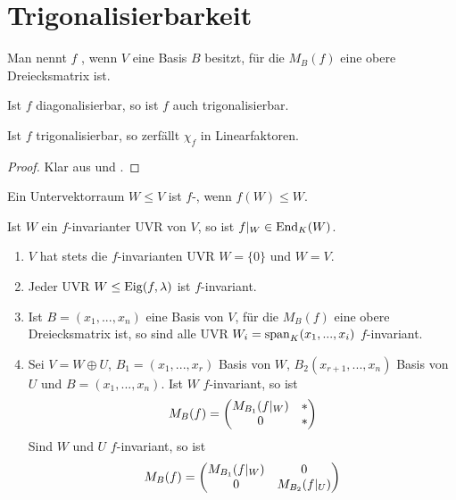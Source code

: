 \section{Trigonalisierbarkeit}

\begin{definition}
	Man nennt $f$ , wenn $V$ eine Basis $B$ besitzt, für die $M_B(f)$ eine obere Dreiecksmatrix ist.
\end{definition}

\begin{example}
	Ist $f$ diagonalisierbar, so ist $f$ auch trigonalisierbar.
\end{example}

\begin{lemma}
	Ist $f$ trigonalisierbar, so zerfällt $\chi_f$ in Linearfaktoren.
\end{lemma}
\begin{proof}
	Klar aus  und .
\end{proof}

\begin{definition}[invariant]
	Ein Untervektorraum $W\le V$ ist $f$-, wenn $f(W)\le W$.
\end{definition}

\begin{remark}
	Ist $W$ ein $f$-invarianter UVR von $V$, so ist $f\vert_W\in \operatorname{End}_K(W)$.
\end{remark}

\begin{example}
	\begin{enumerate}
		\item $V$ hat stets die $f$-invarianten UVR $W=\{0\}$ und $W=V$.
		\item Jeder UVR $W\le \operatorname{Eig}(f,\lambda)$ ist $f$-invariant.
		\item Ist $B=(x_1,...,x_n)$ eine Basis von $V$, für die $M_B(f)$ eine obere Dreiecksmatrix ist, so sind alle UVR $W_i=\operatorname{span}_K(x_1,...,x_i)$ $f$-invariant.
		\item Sei $V=W\oplus U$, $B_1=(x_1,...,x_r)$ Basis von $W$, $B_2(x_{r+1},...,x_n)$ Basis von $U$ und $B=(x_1,...,x_n)$. Ist $W$ $f$-invariant, so ist 
		\begin{align}
			M_B(f)=\begin{pmatrix}M_{B_1}(f\vert_W)&*\\0&*\end{pmatrix}\notag
		\end{align}
		Sind $W$ und $U$ $f$-invariant, so ist 
		\begin{align}
			M_B(f)=\begin{pmatrix}M_{B_1}(f\vert_W)&0\\0&M_{B_2}(f\vert_U)\end{pmatrix}\notag
		\end{align}
	\end{enumerate}
\end{example}

